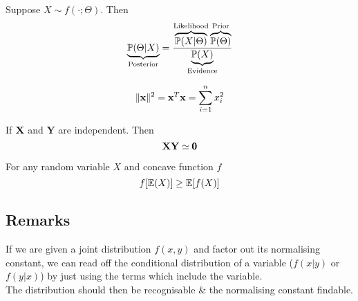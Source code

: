 \documentclass[11pt,a4paper]{article}
\begin{document}
Suppose $X\sim f(\cdot;\Theta)$. Then
$$\underbrace{\mathbb{P}(\Theta|X)}_\text{Posterior}=\frac{\overbrace{\mathbb{P}(X|\Theta)}^\text{Likelihood}\overbrace{\mathbb{P}(\Theta)}^\text{Prior}}{\underbrace{\mathbb{P}(X)}_\text{Evidence}}$$

$$\|\textbf{x}\|^2=\textbf{x}^T\textbf{x}=\sum_{i=1}^nx_i^2$$

\theorem{}
If $\textbf{X}$ and $\textbf{Y}$ are independent. Then
$$\textbf{X}\textbf{Y}\simeq\pmb0$$

For any random variable $X$ and concave function $f$
$$f[\mathbb{E}(X)]\geq\mathbb{E}[f(X)]$$

\subsection{Remarks}

If we are given a joint distribution $f(x,y)$ and factor out its normalising constant, we can read off the conditional distribution of a variable ($f(x|y)$ or $f(y|x)$) by just using the terms which include the variable.\\
The distribution should then be recognisable \& the normalising constant findable.
\end{document}
